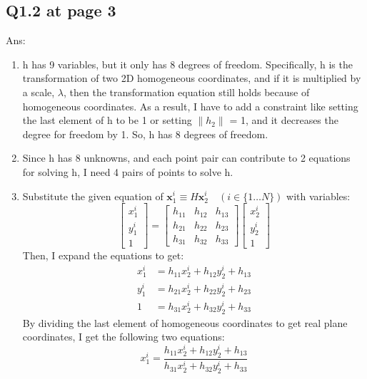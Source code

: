 \documentclass{article}
\begin{document}
	
	\newpage
	\subsection*{Q1.2 at page 3}
	Ans:\\
	\begin{enumerate}
		\item h has 9 variables, but it only has 8 degrees of freedom. Specifically, h is the transformation of two 2D homogeneous coordinates, and if it is multiplied by a scale, $\lambda$, then the transformation equation still holds because of homogeneous coordinates. As a result, I have to add a constraint like setting the last element of h to be 1 or setting $\|h_2\|$ = 1, and it decreases the degree for freedom by 1. So, h has 8 degrees of freedom.
		 
		\item Since h has 8 unknowns, and each point pair can contribute to 2 equations for solving h, I need 4 pairs of points to solve h.
    	\item Substitute the given equation of $\mathbf{x}_1^i \equiv H \mathbf{x}_2^i \quad (i \in \{1 \dots N\})$ with variables:\\
		\[
			\begin{bmatrix}
				x^i_1 \\
				y^i_1 \\
				1
			\end{bmatrix}
			=
			\begin{bmatrix}
			h_{11} & h_{12} & h_{13} \\
			h_{21} & h_{22} & h_{23} \\
			h_{31} & h_{32} & h_{33}
			\end{bmatrix}
			\begin{bmatrix}
				x^i_2 \\
				y^i_2 \\
				1
			\end{bmatrix}
		\]
		Then, I expand the equations to get:\\
		\begin{align*}
			x_1^i &= h_{11} x_2^i + h_{12} y_2^i + h_{13} \\
			y_1^i &= h_{21} x_2^i + h_{22} y_2^i + h_{23} \\
			1 &= h_{31} x_2^i + h_{32} y_2^i + h_{33}
		\end{align*}
		By dividing the last element of homogeneous coordinates to get real plane coordinates, I get the following two equations:
		\[
			x^i_1 = \frac{h_{11}x^i_2 + h_{12}y^i_2 + h_{13}}{h_{31}x^i_2 + h_{32}y^i_2 + h_{33}}
\]
\end{enumerate}
\end{document}
